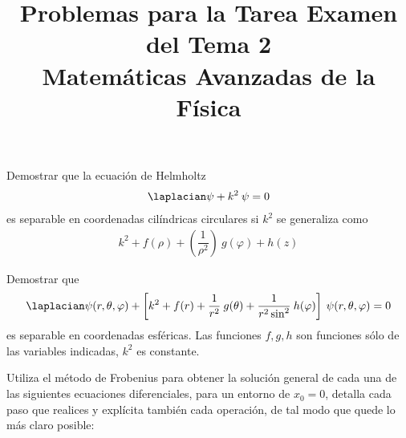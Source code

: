 
\title{Problemas para  la Tarea Examen del Tema 2 \\ \large{Matemáticas Avanzadas de la Física}\vspace{-3ex}}
\date{ }

\renewcommand\labelenumii{\theenumi.{\arabic{enumii}}}
\maketitle
\fontsize{14}{14}\selectfont
\begin{milista}
\item Demostrar que la ecuación de Helmholtz
\begin{align*}
\laplacian \psi + k^{2} \: \psi = 0
\end{align*}
es separable en coordenadas cilíndricas circulares si $k^{2}$ se generaliza como
\begin{align*}
k^{2} + f(\rho) + \left( \dfrac{1}{\rho^{2}} \right) \: g(\varphi) + h(z)
\end{align*}
\item Demostrar que
\begin{align*}
\laplacian \psi (r, \theta, \varphi) + \left[ k^{2} + f(r) + \dfrac{1}{r^{2}} \: g(\theta) + \dfrac{1}{r^{2} \sin^{2}} \: h(\varphi) \right] \: \psi (r, \theta, \varphi) = 0
\end{align*}
es separable en coordenadas esféricas. Las funciones $f, g, h$ son funciones sólo de las variables indicadas, $k^{2}$ es constante.
\item Utiliza el método de Frobenius para obtener la solución general de cada una de las siguientes ecuaciones diferenciales, para un entorno de $x_{0} = 0$, detalla cada paso que realices y explícita también cada operación, de tal modo que quede lo más claro posible:
\begin{milista}
\begin{fleqn}

\end{fleqn}
\end{milista}
\end{milista}
